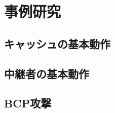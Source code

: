 \documentclass[12pt,a4paper]{jbook}
\begin{document}
\chapter{事例研究}
\section{キャッシュの基本動作}

\section{中継者の基本動作}

\section{BCP攻撃}
\end{document}
